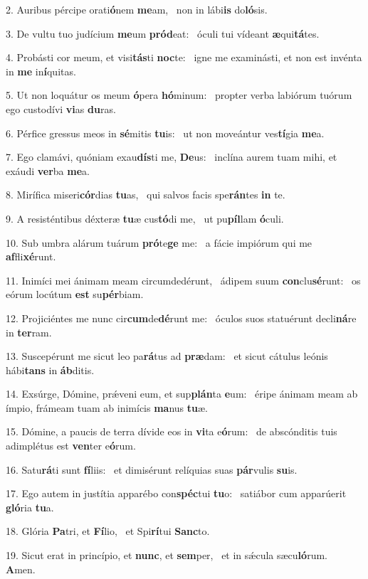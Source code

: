 2. Auribus pércipe orati\textbf{ó}nem \textbf{me}am, \ast\  non in lábi\textbf{is} do\textbf{ló}sis.\

3. De vultu tuo judícium \textbf{me}um \textbf{pród}eat: \ast\  óculi tui vídeant \textbf{æ}qui\textbf{tá}tes.\

4. Probásti cor meum, et visi\textbf{tás}ti \textbf{noc}te: \ast\  igne me examinásti, et non est invénta in \textbf{me} in\textbf{í}quitas.\

5. Ut non loquátur os meum \textbf{ó}pera \textbf{hó}minum: \ast\  propter verba labiórum tuórum ego custodívi \textbf{vi}as \textbf{du}ras.\

6. Pérfice gressus meos in \textbf{sé}mitis \textbf{tu}is: \ast\  ut non moveántur ves\textbf{tí}gia \textbf{me}a.\

7. Ego clamávi, quóniam exau\textbf{dís}ti me, \textbf{De}us: \ast\  inclína aurem tuam mihi, et exáudi \textbf{ver}ba \textbf{me}a.\

8. Mirífica miseri\textbf{cór}dias \textbf{tu}as, \ast\  qui salvos facis spe\textbf{rán}tes \textbf{in} te.\

9. A resisténtibus déxteræ \textbf{tu}æ cus\textbf{tó}di me, \ast\  ut pu\textbf{píl}lam \textbf{ó}culi.\

10. Sub umbra alárum tuárum \textbf{pró}te\textbf{ge} me: \ast\  a fácie impiórum qui me \textbf{af}fli\textbf{xé}runt.\

11. Inimíci mei ánimam meam circumdedérunt, \dag\  ádipem suum \textbf{con}clu\textbf{sé}runt: \ast\  os eórum locútum \textbf{est} su\textbf{pér}biam.\

12. Projiciéntes me nunc cir\textbf{cum}de\textbf{dé}runt me: \ast\  óculos suos statuérunt decli\textbf{ná}re in \textbf{ter}ram.\

13. Suscepérunt me sicut leo pa\textbf{rá}tus ad \textbf{præ}dam: \ast\  et sicut cátulus leónis hábi\textbf{tans} in \textbf{áb}ditis.\

14. Exsúrge, Dómine, prǽveni eum, et sup\textbf{plán}ta \textbf{e}um: \ast\  éripe ánimam meam ab ímpio, frámeam tuam ab inimícis \textbf{ma}nus \textbf{tu}æ.\

15. Dómine, a paucis de terra dívide eos in \textbf{vi}ta e\textbf{ó}rum: \ast\  de abscónditis tuis adimplétus est \textbf{ven}ter e\textbf{ó}rum.\

16. Satu\textbf{rá}ti sunt \textbf{fí}liis: \ast\  et dimisérunt relíquias suas \textbf{pár}vulis \textbf{su}is.\

17. Ego autem in justítia apparébo con\textbf{spéc}tui \textbf{tu}o: \ast\  satiábor cum apparúerit \textbf{gló}ria \textbf{tu}a.\

18. Glória \textbf{Pa}tri, et \textbf{Fí}lio, \ast\  et Spi\textbf{rí}tui \textbf{Sanc}to.\

19. Sicut erat in princípio, et \textbf{nunc}, et \textbf{sem}per, \ast\  et in sǽcula sæcu\textbf{ló}rum. \textbf{A}men.\

